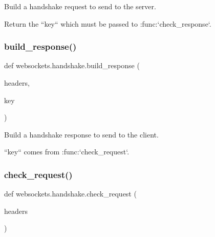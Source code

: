 \begin{DoxyVerb}Build a handshake request to send to the server.

Return the ``key`` which must be passed to :func:`check_response`.\end{DoxyVerb}
 \mbox{\label{namespacewebsockets_1_1handshake_a636125b0e4dee92d2a9ba759e3b1d0ee}} 
\subsubsection{\texorpdfstring{build\+\_\+response()}{build\_response()}}
{\footnotesize\ttfamily def websockets.\+handshake.\+build\+\_\+response (\begin{DoxyParamCaption}\item[{}]{headers,  }\item[{}]{key }\end{DoxyParamCaption})}

\begin{DoxyVerb}Build a handshake response to send to the client.

``key`` comes from :func:`check_request`.\end{DoxyVerb}
 \mbox{\label{namespacewebsockets_1_1handshake_ac1ce106fd4af8a831be403588df35c44}} 
\subsubsection{\texorpdfstring{check\+\_\+request()}{check\_request()}}
{\footnotesize\ttfamily def websockets.\+handshake.\+check\+\_\+request (\begin{DoxyParamCaption}\item[{}]{headers }\end{DoxyParamCaption})}


